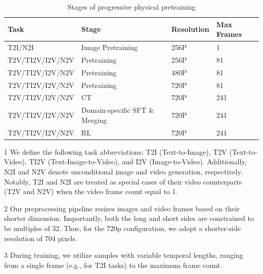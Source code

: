 \documentclass{llmxive}
\begin{document}
\begin{table}[t]
\centering
\small
\begin{threeparttable}
\begin{tabular}{C{4cm} | C{5cm} |C{2cm}| C{2cm}}
\hline 
Task  & Stage & Resolution  & Max Frames  \\ 
\hline
T2I/N2I	& Image Pretraining	& 256P	& 1  \\
\hline
T2V/TI2V/I2V/N2V	&  Pretraining & 256P	& 81  \\
T2V/TI2V/I2V/N2V	&  Pretraining	& 480P	& 81   \\
T2V/TI2V/I2V/N2V	&  Pretraining & 720P	& 81 \\
\hline
T2V/TI2V/I2V/N2V	& CT	& 720P	& 241   \\
\hline
T2V/TI2V/I2V/N2V	& Domain-specific SFT \& Merging	& 720P	& 241  \\
\hline
T2V/TI2V/I2V/N2V	& RL &	720P&	241  \\
\hline
\end{tabular}
\begin{tablenotes}
\footnotesize
\item[1] We define the following task abbreviations: T2I (Text-to-Image), T2V (Text-to-Video), TI2V (Text-Image-to-Video), and I2V (Image-to-Video). Additionally, N2I and N2V denote unconditional image and video generation, respectively. Notably, T2I and N2I are treated as special cases of their video counterparts (T2V and N2V) when the video frame count equal to 1. 
\item[2] Our preprocessing pipeline resizes images and video frames based on their shorter dimension. Importantly, both the long and short sides are constrained to be multiples of 32. Thus, for the 720p configuration, we adopt a shorter-side resolution of 704 pixels.
\item[3] During training, we utilize samples with variable temporal lengths, ranging from a single frame (e.g., for T2I tasks) to the maximum frame count.
\end{tablenotes}
\end{threeparttable}
\caption{Stages of progressive physical pretraining}
\label{tab:pretraining_setting}
\end{table}
\end{document}
